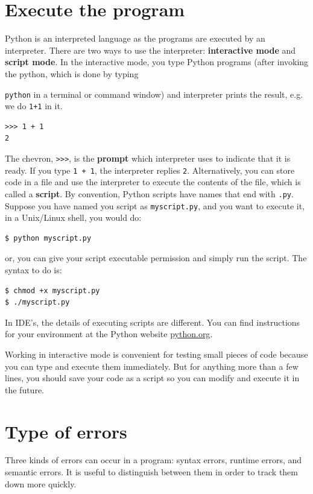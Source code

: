 \documentclass[10pt]{book}
\begin{document}
\section{Execute the program}
Python is an interpreted language as the programs are executed by an interpreter. There are two ways to use the interpreter: {\bf interactive mode} and {\bf script mode}. In the interactive mode, you type Python programs (after invoking the python, which is done by typing {\verb"python" in a terminal or command window) and interpreter prints the result, e.g. we do \verb"1+1" in it.

\beforeverb
\begin{verbatim}
>>> 1 + 1
2
\end{verbatim}
\afterverb

The chevron, \verb">>>", is the {\bf prompt} which interpreter uses to indicate that it is ready. If you type {\tt 1 + 1}, the interpreter replies {\tt 2}. Alternatively, you can store code in a file and use the interpreter to execute the contents of the file, which is called a {\bf script}.  By convention, Python scripts have names that end with {\tt .py}. Suppose you have named you script as {\tt myscript.py}, and you want to execute it, in a Unix/Linux shell, you would do:
\beforeverb
\begin{verbatim}
$ python myscript.py
\end{verbatim}
\afterverb
or, you can give your script executable permission and simply run the script. The syntax to do is:
\beforeverb
\begin{verbatim}
$ chmod +x myscript.py
$ ./myscript.py
\end{verbatim}
\afterverb

In IDE's, the details of executing scripts are different.  You can find instructions for your environment at the Python website \url{python.org}.

Working in interactive mode is convenient for testing small pieces of code because you can type and execute them immediately.  But for
anything more than a few lines, you should save your code as a script so you can modify and execute it in the future.


\section{Type of errors}
Three kinds of errors can occur in a program: syntax errors, runtime  errors, and semantic errors. It is useful to distinguish between them in order to track them down more quickly.

}
\end{document}
